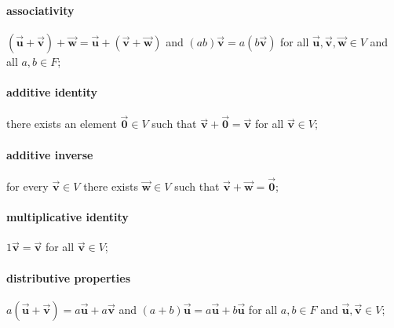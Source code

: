 \documentclass[MathsNotesBase.tex]{subfiles}
\def\u{\vec{\bm{u}}}
\def\v{\vec{\bm{v}}}
\def\w{\vec{\bm{w}}}
\def\0{\vec{\bm{0}}}
\begin{document}
{\begin{definition}
		\paragraph*{associativity} $(\u + \v) + \w = \u + (\v + \w)$ and $(ab)\v = a(b\v)$ for all $\u, \v, \w \in V$ and all $a, b \in F$;
		\paragraph*{additive identity} there exists an element $\0 \in V$ such that $\v + \0 = \v$ for all $\v \in V$;
		\paragraph*{additive inverse} for every $\v \in V$ there exists $\w \in V$ such that $\v + \w = \0$;
		\paragraph*{multiplicative identity} $1\v = \v$ for all $\v \in V$;
		\paragraph*{distributive properties} $a(\u + \v) = a\u + a\v$ and $(a + b)\u = a\u + b\u$ for all $a, b \in F$ and $\u,\v \in V$;
		\end{definition}
	}
	
\end{document}
